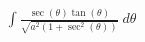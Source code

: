 \documentclass[preview]{standalone}
\begin{document}
\begin{align*}
\int \frac{\sec(\theta)\tan(\theta)}{\sqrt{a^2(1+\sec^2(\theta))}} \ d\theta
\end{align*}
\end{document}
